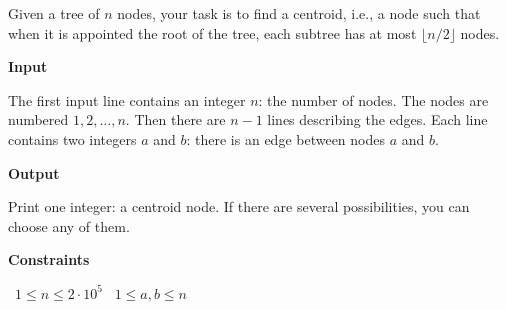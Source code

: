 Given a tree of $n$ nodes, your task is to find a centroid, i.e., a node such that when it is appointed the root of the tree, each subtree has at most $\lfloor n/2 \rfloor$ nodes.

\vspace{0.3cm}\noindent\textbf{Input}

The first input line contains an integer $n$: the number of nodes. The nodes are numbered $1,2,…,n$.
Then there are $n-1$ lines describing the edges. Each line contains two integers $a$ and $b$: there is an edge between nodes $a$ and $b$.

\vspace{0.3cm}\noindent\textbf{Output}

Print one integer: a centroid node. If there are several possibilities, you can choose any of them.

\vspace{0.3cm}\noindent\textbf{Constraints}

\textbullet\ $1 \le n \le 2 \cdot 10^5$
\textbullet\ $1 \le a,b \le n$